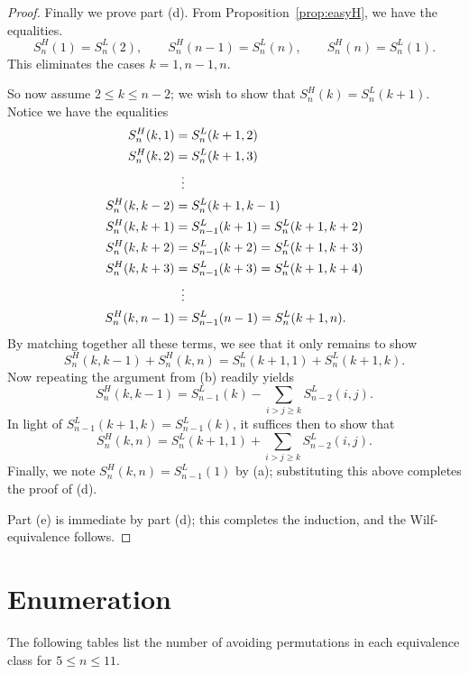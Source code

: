 \documentclass[11pt]{amsart}
\theoremstyle{definition}
\begin{document}
\begin{proof}
	Finally we prove part (d).
	From Proposition~\ref{prop:easyH}, we have the equalities.
	\[
		S_n^H(1) = S_n^L(2), \qquad
		S_n^H(n-1) = S_n^L(n), \qquad
		S_n^H(n) = S_n^L(1).
	\]
	This eliminates the cases $k=1, n-1, n$.

	So now assume $2 \le k \le n-2$;
	we wish to show that $S_n^H(k) = S_n^L(k+1)$.
	Notice we have the equalities
	\begin{align*}
		S_n^H(k,1) &= S_n^L(k+1, 2) \\
		S_n^H(k,2) &= S_n^L(k+1, 3) \\
		&\vdotswithin= \\
		S_n^H(k,k-2) &= S_n^L(k+1,k-1) \\
		S_n^H(k,k+1) &= S_{n-1}^L(k+1) = S_n^L(k+1,k+2) \\
		S_n^H(k,k+2) &= S_{n-1}^L(k+2) = S_n^L(k+1,k+3) \\
		S_n^H(k,k+3) &= S_{n-1}^L(k+3) = S_n^L(k+1,k+4) \\
		&\vdotswithin= \\
		S_n^H(k,n-1) &= S_{n-1}^L(n-1) = S_n^L(k+1,n).
	\end{align*}
	By matching together all these terms,
	we see that it only remains to show
	\[
		S_n^H(k,k-1) + S_n^H(k,n)
		= S_n^L(k+1,1) + S_n^L(k+1,k).
	\]
	Now repeating the argument from (b) readily yields
	\[ S_n^H(k,k-1) = S_{n-1}^L(k)
		- \sum_{i >j \ge k} S_{n-2}^L(i,j).  \]
	In light of $S_{n-1}^L(k+1,k) = S_{n-1}^L(k)$,
	it suffices then to show that
	\[ S_n^H(k,n) = S_n^L(k+1,1) + \sum_{i>j\ge k} S_{n-2}^L(i,j). \]
	Finally, we note $S_n^H(k,n) = S_{n-1}^L(1)$ by (a);
	substituting this above completes the proof of (d).

	Part (e) is immediate by part (d);
	this completes the induction,
	and the Wilf-equivalence follows.
\end{proof}

\newpage
\appendix

\section{Enumeration}
\label{sec:oeis}

The following tables list the number of avoiding permutations
in each equivalence class for $5 \le n \le 11$.
\end{document}
